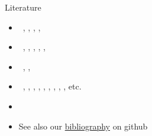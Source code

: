 \begin{frame}[c]{Literature}
  \begin{itemize}
  \item {} \
    \cite{baral02a},
    \cite{gekakasc12a},
    \cite{gelkah14a},
    \cite{lifschitz19a},
    \cite{martru93a}
  \item {} \
    \cite{lifschitz04a},
    \cite{gelfond08a},
    \cite{eiiakr09a},
    \cite{breitr11a},
    \cite{kascwa17a},
    \cite{schwol18b}
  \item {} \
    \cite{breitr16a},
    \cite{schwol18a},
    \cite{gekakasc26a}
  \item {} \
    \cite{gellif88b},
    \cite{gellif90a},
    \cite{bargel94a},
    \cite{niemela99a},
    \cite{martru99a},
    \cite{lifschitz02a},
    \cite{gelleo02a},
    \cite{gehakalisc15a},
    \cite{karoscwa21a},
    etc.
  \item {} \
    \cite{PotasscoUserGuide}
    \bigskip
  \item<2-> See also our \href{https://github.com/krr-up/bibliography.git}{bibliography} on github
  \end{itemize}
\end{frame}
%
